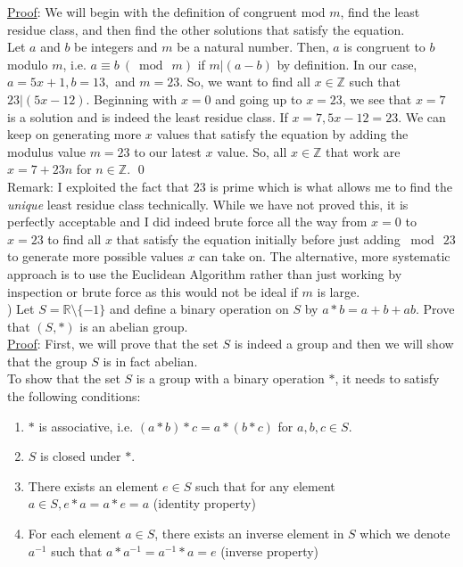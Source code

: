 \documentclass{article}
\begin{document}
\noindent
\underline{Proof}: We will begin with the definition of congruent mod $m$, find the least residue class, and then find the other solutions that satisfy the equation. \\

\noindent
Let $a$ and $b$ be integers and $m$ be a natural number. Then, $a$ is congruent to $b$ modulo $m$, i.e. $a \equiv b\ (\bmod\ m)$ if $m \rvert (a-b)$ by definition. In our case, $a = 5x + 1, b = 13,$ and $m = 23$. So, we want to find all $x \in \mathbb{Z}$ such that $23 \rvert (5x-12)$. Beginning with $x = 0$ and going up to $x = 23$, we see that $x = 7$ is a solution and is indeed the least residue class. If $x = 7, 5x-12 = 23$. We can keep on generating more $x$ values that satisfy the equation by adding the modulus value $m = 23$ to our latest $x$ value. So, all $x \in \mathbb{Z}$ that work are $x = 7 + 23n$ for $n \in \mathbb{Z}$. \qed \\

\noindent
Remark: I exploited the fact that $23$ is prime which is what allows me to find the \textit{unique} least residue class technically. While we have not proved this, it is perfectly acceptable and I did indeed brute force all the way from $x = 0$ to $x = 23$ to find all $x$ that satisfy the equation initially before just adding $\bmod\ 23$ to generate more possible values $x$ can take on.  The alternative, more systematic approach is to use the Euclidean Algorithm rather than just working by inspection or brute force as this would not be ideal if $m$ is large. \\

) Let $S = \mathbb{R} \setminus \{-1\}$ and define a binary operation on $S$ by $a * b = a + b + ab.$ Prove that $(S, *)$ is an abelian group. \\

\noindent
\underline{Proof}: First, we will prove that the set $S$ is indeed a group and then we will show that the group $S$ is in fact abelian. \\

\noindent
To show that the set $S$ is a group with a binary operation $*$, it needs to satisfy the following conditions:
\begin{enumerate}
  \item $*$ is associative, i.e. $(a * b) * c = a * (b * c)$ for $a, b, c \in S$.
  \item $S$ is closed under $*$.
  \item There exists an element $e \in S$ such that for any element $a \in S, e * a = a * e = a$ (identity property)
  \item For each element $a \in S$, there exists an inverse element in $S$ which we denote $a^{-1}$ such that $a * a^{-1} = a^{-1} * a = e$ (inverse property)
\end{enumerate}
\end{document}
